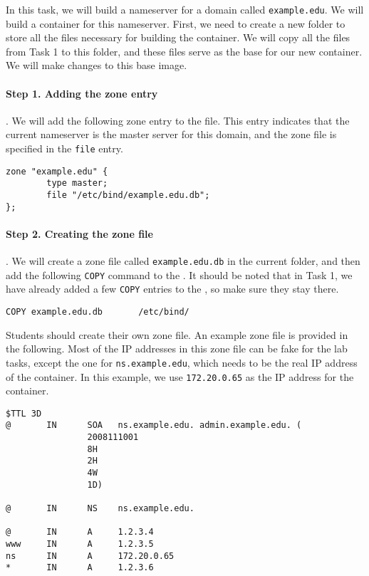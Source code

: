 In this task, we will build a nameserver for a domain 
called \texttt{example.edu}. We will build a container 
for this nameserver. First, we need to create a new folder to
store all the files necessary for building the container.
We will copy all the files from Task 1 to this folder, and these files serve
as the base for our new container. We will make changes to this base image. 


\paragraph{Step 1. Adding the zone entry}. We will 
add the following zone entry to the 
 file. This entry indicates that the current nameserver 
is the master server for this domain, and the zone file is 
specified in the \texttt{file} entry.  


\begin{lstlisting}
zone "example.edu" {
        type master;
        file "/etc/bind/example.edu.db";
};
\end{lstlisting}


\paragraph{Step 2. Creating the zone file}. We will 
create a zone file called \texttt{example.edu.db} 
in the current folder, and then add the following
\texttt{COPY} command to the \dockerfile. It should be 
noted that in Task 1, we have already added a few 
\texttt{COPY} entries to the \dockerfile, so make sure they 
stay there. 


\begin{lstlisting}
COPY example.edu.db       /etc/bind/
\end{lstlisting}


Students should create their own zone file. An example
zone file is provided in the following. Most of the IP 
addresses in this zone file can be fake for the lab tasks, except 
the one for \texttt{ns.example.edu}, which needs to
be the real IP address of the container. 
In this example, we use \texttt{172.20.0.65} as the IP
address for the container.


\begin{lstlisting}
$TTL 3D
@       IN      SOA   ns.example.edu. admin.example.edu. (
                2008111001
                8H
                2H
                4W
                1D)

@       IN      NS    ns.example.edu.

@       IN      A     1.2.3.4
www     IN      A     1.2.3.5
ns      IN      A     172.20.0.65
*       IN      A     1.2.3.6
\end{lstlisting}
 
